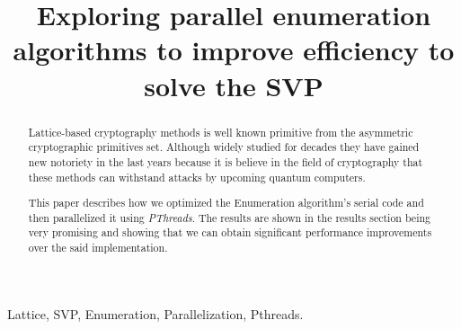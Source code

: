 \documentclass[conference]{IEEEtran}
\begin{document}
%
\title{Exploring parallel enumeration algorithms to improve efficiency to solve the SVP}


\author{
\and
{}
\and
{}
}

\maketitle

\begin{abstract}
    Lattice-based cryptography methods is well known primitive  from  the  asymmetric  cryptographic  primitives  set.  Although widely studied for decades they have gained new notoriety in the last years because it is believe in the field of cryptography that these methods can withstand attacks by upcoming quantum computers.
    
    This paper describes how we optimized the Enumeration algorithm's serial code and then parallelized it using \emph{PThreads}. The results are shown in the results section being very promising and showing that we can obtain significant performance improvements over the said implementation.
    
\end{abstract}


\begin{IEEEkeywords}
Lattice, SVP, Enumeration, Parallelization, Pthreads.
\end{IEEEkeywords}
\end{document}
